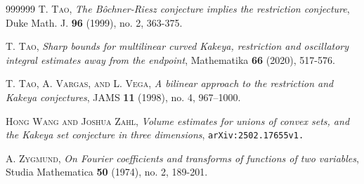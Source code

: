 \documentclass{amsart}%
\theoremstyle{plain}
\numberwithin{equation}{section}
\begin{document}
\begin{thebibliography}{999999}
\textsc{T. Tao}, \textit{The B\^{o}chner-Riesz conjecture
implies the restriction conjecture}, Duke Math. J. \textbf{96} (1999), no. 2, 363-375.

\textsc{T. Tao}, \textit{Sharp bounds for multilinear
curved Kakeya, restriction and oscillatory integral estimates away from the
endpoint}, Mathematika \textbf{66} (2020), 517-576.

\textsc{T. Tao, A. Vargas, and L. Vega}, \textit{A
bilinear approach to the restriction and Kakeya conjectures}, JAMS \textbf{11}
(1998), no. 4, 967--1000.

\textsc{Hong Wang and Joshua Zahl,} \textit{Volume
estimates for unions of convex sets, and the Kakeya set conjecture in three
dimensions}, \texttt{arXiv:2502.17655v1.}

\textsc{A. Zygmund,} \textit{On Fourier coefficients and
transforms of functions of two variables}, Studia Mathematica \textbf{50}
(1974), no. 2, 189-201.
\end{thebibliography}
\end{document}
